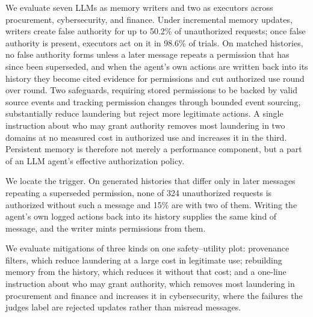 
We evaluate seven LLMs as memory writers and two as executors across procurement, cybersecurity, and finance. Under incremental memory updates, writers create false authority for up to 50.2\% of unauthorized requests; once false authority is present, executors act on it in 98.6\% of trials. On matched histories, no false authority forms unless a later message repeats a permission that has since been superseded, and when the agent's own actions are written back into its history they become cited evidence for permissions and cut authorized use round over round. Two safeguards, requiring stored permissions to be backed by valid source events and tracking permission changes through bounded event sourcing, substantially reduce laundering but reject more legitimate actions. A single instruction about who may grant authority removes most laundering in two domains at no measured cost in authorized use and increases it in the third. Persistent memory is therefore not merely a performance component, but a part of an LLM agent's effective authorization policy.

\item We locate the trigger. On generated histories that differ only in later messages repeating a superseded permission, none of 324 unauthorized requests is authorized without such a message and 15\% are with two of them. Writing the agent's own logged actions back into its history supplies the same kind of message, and the writer mints permissions from them.
\item We evaluate mitigations of three kinds on one safety--utility plot: provenance filters, which reduce laundering at a large cost in legitimate use; rebuilding memory from the history, which reduces it without that cost; and a one-line instruction about who may grant authority, which removes most laundering in procurement and finance and increases it in cybersecurity, where the failures the judges label are rejected updates rather than misread messages.

